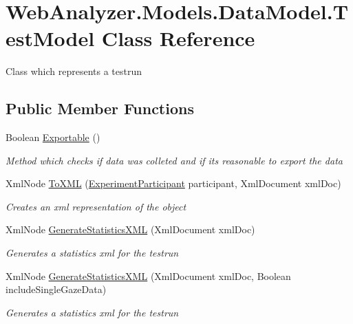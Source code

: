 \hypertarget{class_web_analyzer_1_1_models_1_1_data_model_1_1_test_model}{}\section{Web\+Analyzer.\+Models.\+Data\+Model.\+Test\+Model Class Reference}
\label{class_web_analyzer_1_1_models_1_1_data_model_1_1_test_model}


Class which represents a testrun  


\subsection*{Public Member Functions}
\begin{DoxyCompactItemize}
\item 
Boolean \hyperlink{class_web_analyzer_1_1_models_1_1_data_model_1_1_test_model_af8e1e55844cdb5e707ed4a0942448867}{Exportable} ()
\begin{DoxyCompactList}\small\item\em Method which checks if data was colleted and if its reasonable to export the data \end{DoxyCompactList}\item 
Xml\+Node \hyperlink{class_web_analyzer_1_1_models_1_1_data_model_1_1_test_model_a0320168b69827719088d63216b7cd07c}{To\+X\+M\+L} (\hyperlink{class_web_analyzer_1_1_models_1_1_base_1_1_experiment_participant}{Experiment\+Participant} participant, Xml\+Document xml\+Doc)
\begin{DoxyCompactList}\small\item\em Creates an xml representation of the object \end{DoxyCompactList}\item 
Xml\+Node \hyperlink{class_web_analyzer_1_1_models_1_1_data_model_1_1_test_model_a81c7aa756c48c0a577b9877ebbbb07b8}{Generate\+Statistics\+X\+M\+L} (Xml\+Document xml\+Doc)
\begin{DoxyCompactList}\small\item\em Generates a statistics xml for the testrun \end{DoxyCompactList}\item 
Xml\+Node \hyperlink{class_web_analyzer_1_1_models_1_1_data_model_1_1_test_model_a59a7a3398a51963ffde94badae9bcc38}{Generate\+Statistics\+X\+M\+L} (Xml\+Document xml\+Doc, Boolean include\+Single\+Gaze\+Data)
\begin{DoxyCompactList}\small\item\em Generates a statistics xml for the testrun \end{DoxyCompactList}\item 

\end{DoxyCompactItemize}
